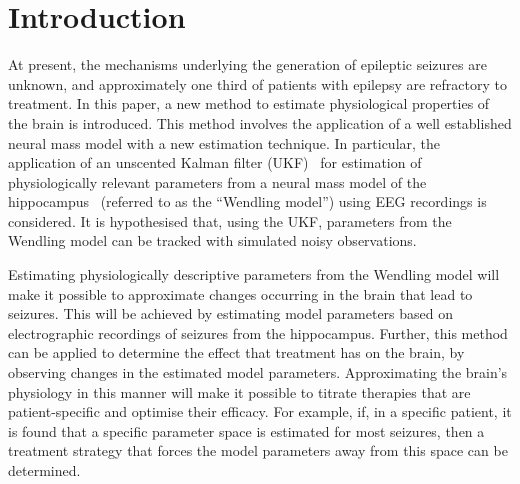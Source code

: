 \section{Introduction}


At present, the mechanisms underlying the generation of epileptic seizures are unknown, and approximately one third of patients with epilepsy are refractory to treatment. In this paper, a new method to estimate physiological properties of the brain is introduced. This method involves the application of a well established neural mass model with a new estimation technique. In particular, the application of an unscented Kalman filter (UKF)~\citep{voss2004nonlinear} for estimation of physiologically relevant parameters from a neural mass model of the hippocampus~\citep{wendling2002epileptic} (referred to as the ``Wendling model'') using EEG recordings is considered. It is hypothesised that, using the UKF, parameters from the Wendling model can be tracked with simulated noisy observations.

Estimating physiologically descriptive parameters from the Wendling model will make it possible to approximate changes occurring in the brain that lead to seizures. This will be achieved by estimating model parameters based on electrographic recordings of seizures from the hippocampus. Further, this method can be applied to determine the effect that treatment has on the brain, by observing changes in the estimated model parameters. Approximating the brain's physiology in this manner will make it possible to titrate therapies that are patient-specific and optimise their efficacy. For example, if, in a specific patient, it is found that a specific parameter space is estimated for most seizures, then a treatment strategy that forces the model parameters away from this space can be determined.


